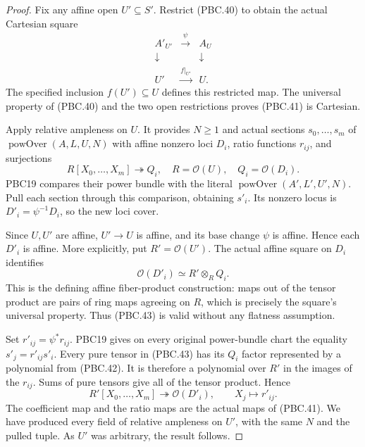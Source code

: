 \documentclass[11pt,a4paper]{article}
\numberwithin{equation}{section}
\theoremstyle{remark}\newtheorem{remark}[theorem]{Remark}
\begin{document}
\begin{proof}
Fix any affine open $U'\subseteq S'$.  Restrict (PBC.40)
to obtain the actual Cartesian square
\[
 \begin{array}{ccc}
 A'_{U'}&\xrightarrow{\psi}&A_U\\
 \downarrow&&\downarrow\\
 U'&\xrightarrow{f|_{U'}}&U .
 \end{array}
                                                        \tag{PBC.41}
\]
The specified inclusion $f(U')\subseteq U$ defines this
restricted map.  The universal property of (PBC.40) and
the two open restrictions proves (PBC.41) is Cartesian.

Apply relative ampleness on $U$.  It provides $N\ge1$
and actual sections $s_0,\ldots,s_m$ of
$\operatorname{powOver}(A,L,U,N)$ with affine nonzero
loci $D_i$, ratio functions $r_{ij}$, and surjections
\[
 R[X_0,\ldots,X_m]\twoheadrightarrow Q_i,
 \quad R=\mathcal O(U),\quad Q_i=\mathcal O(D_i).
                                                        \tag{PBC.42}
\]
PBC19 compares their power bundle with the literal
$\operatorname{powOver}(A',L',U',N)$.
Pull each section through this comparison, obtaining $s'_i$.
Its nonzero locus is
$D'_i=\psi^{-1}D_i$, so the new loci cover.

Since $U,U'$ are affine, $U'\to U$ is affine, and its
base change $\psi$ is affine.  Hence each $D'_i$ is
affine.  More explicitly, put $R'=\mathcal O(U')$.
The actual affine square on $D_i$ identifies
\[
 \mathcal O(D'_i)\simeq R'\otimes_R Q_i.
                                                        \tag{PBC.43}
\]
This is the defining affine fiber-product construction:
maps out of the tensor product are pairs of ring maps
agreeing on $R$, which is precisely the square's universal
property.  Thus (PBC.43) is valid without any flatness
assumption.

Set $r'_{ij}=\psi^*r_{ij}$.  PBC19 gives on every original
power-bundle chart the equality $s'_j=r'_{ij}s'_i$.
Every pure tensor in (PBC.43) has its $Q_i$ factor represented
by a polynomial from (PBC.42).  It is therefore a polynomial
over $R'$ in the images of the $r_{ij}$.  Sums of pure
tensors give all of the tensor product.  Hence
\[
 R'[X_0,\ldots,X_m]\twoheadrightarrow\mathcal O(D'_i),
       \qquad X_j\longmapsto r'_{ij}.
                                                        \tag{PBC.44}
\]
The coefficient map and the ratio maps are the actual maps
of (PBC.41).  We have produced every field of relative
ampleness on $U'$, with the same $N$ and the pulled tuple.
As $U'$ was arbitrary, the result follows.
\end{proof}
\end{document}
